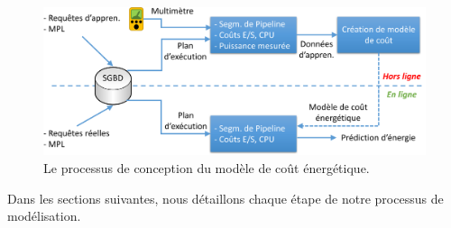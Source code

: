 \begin{figure}
 \centering
 \includegraphics[scale=0.55]{chapitre4/chap4Fig/power-model-building.pdf}
 \caption{Le processus de conception du modèle de coût énergétique.}
 \label{fig:power-model-building}
\end{figure}

Dans les sections suivantes, nous détaillons chaque étape de notre processus de modélisation.

